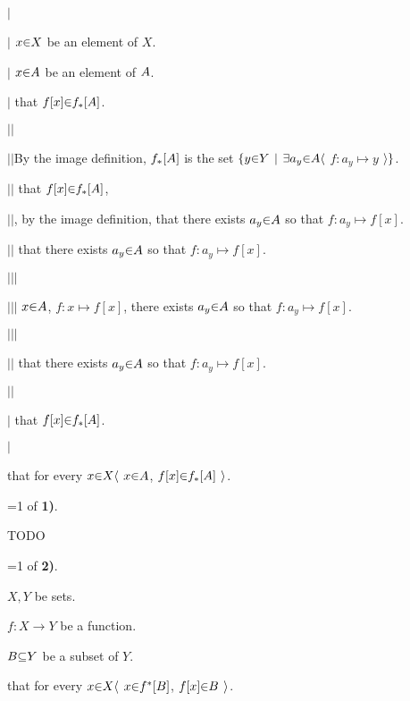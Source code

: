   $|$\hs \par
  $|$\hs {} $x \p\in X$ be an element of $X$. \par
  $|$\hs {} $x \p\in \g A$ be an element of $\g A$. \par
  $|$\hs {} that $f[x] \p\in f_*[\g A]$. \par

    $|$\hs$|$\hs \par
    $|$\hs$|$\hs By the image definition, $f_*[\g A]$ is the set $\a\{y \p\in Y \pipe \a\exists a_y \p\in \g A \a\langle$ $f: a_y \mapsto y$ $\a\rangle \a\}$. \par
    $|$\hs$|$\hs {}  that $f[x] \p\in f_*[\g A]$, \par
    $|$\hs$|$\hs {}, by the image definition,  that there exists $a_y \p\in \g A$ so that $f: a_y \mapsto f[x]$. \par
    $|$\hs$|$\hs {} that there exists $a_y \p\in \g A$ so that $f: a_y \mapsto f[x]$. \par

      $|$\hs$|$\hs$|$\hs \par
      $|$\hs$|$\hs$|$\hs {} $x \p\in \g A$,  $f: x \mapsto f[x]$,  there exists $a_y \p\in \g A$ so that $f: a_y \mapsto f[x]$. \par
      $|$\hs$|$\hs$|$\hs \par

    $|$\hs$|$\hs {} that there exists $a_y \p\in \g A$ so that $f: a_y \mapsto f[x]$. \par
    $|$\hs$|$\hs \par

  $|$\hs {} that $f[x] \p\in f_*[\g A]$. \par
  $|$\hs \par

 that for every $x \p\in X \a\langle$  $x \p\in \g A$,  $f[x] \p\in f_*[\g A]$ $\a\rangle$. \par
\fi

=1
\vs
{} of {\bf 1)}. \par
TODO
\fi

=1
\vs
{} of {\bf 2)}. \par
{} $X,Y$ be sets. \par
{} $f: X \to Y$ be a function. \par
{} $\b B \p\subseteq Y$ be a subset of $Y$. \par
{} that for every $x \p\in X \a\langle$  $x \p\in f^*[\b B]$,  $f[x] \p\in \b B$ $\a\rangle$. \par

